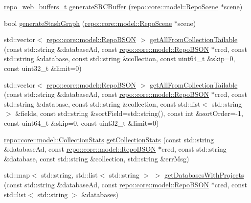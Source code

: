 \begin{DoxyCompactItemize}
\item 
\hyperlink{structrepo__web__buffers__t}{repo\+\_\+web\+\_\+buffers\+\_\+t} \hyperlink{classrepo_1_1manipulator_1_1_repo_manipulator_a3b14104b60d95c19be1b7b1ab507450a}{generate\+S\+R\+C\+Buffer} (\hyperlink{classrepo_1_1core_1_1model_1_1_repo_scene}{repo\+::core\+::model\+::\+Repo\+Scene} $\ast$scene)
\item 
bool \hyperlink{classrepo_1_1manipulator_1_1_repo_manipulator_ac301ad067f763595fc68a902a4249c35}{generate\+Stash\+Graph} (\hyperlink{classrepo_1_1core_1_1model_1_1_repo_scene}{repo\+::core\+::model\+::\+Repo\+Scene} $\ast$scene)
\item 
std\+::vector$<$ \hyperlink{classrepo_1_1core_1_1model_1_1_repo_b_s_o_n}{repo\+::core\+::model\+::\+Repo\+B\+S\+O\+N} $>$ \hyperlink{classrepo_1_1manipulator_1_1_repo_manipulator_a843070b9d4063b6f01e8287df7855e3c}{get\+All\+From\+Collection\+Tailable} (const std\+::string \&database\+Ad, const \hyperlink{classrepo_1_1core_1_1model_1_1_repo_b_s_o_n}{repo\+::core\+::model\+::\+Repo\+B\+S\+O\+N} $\ast$cred, const std\+::string \&database, const std\+::string \&collection, const uint64\+\_\+t \&skip=0, const uint32\+\_\+t \&limit=0)
\item 
std\+::vector$<$ \hyperlink{classrepo_1_1core_1_1model_1_1_repo_b_s_o_n}{repo\+::core\+::model\+::\+Repo\+B\+S\+O\+N} $>$ \hyperlink{classrepo_1_1manipulator_1_1_repo_manipulator_a097c73ccc24132242effc95d8359d960}{get\+All\+From\+Collection\+Tailable} (const std\+::string \&database\+Ad, const \hyperlink{classrepo_1_1core_1_1model_1_1_repo_b_s_o_n}{repo\+::core\+::model\+::\+Repo\+B\+S\+O\+N} $\ast$cred, const std\+::string \&database, const std\+::string \&collection, const std\+::list$<$ std\+::string $>$ \&fields, const std\+::string \&sort\+Field=std\+::string(), const int \&sort\+Order=-\/1, const uint64\+\_\+t \&skip=0, const uint32\+\_\+t \&limit=0)
\item 
\hyperlink{classrepo_1_1core_1_1model_1_1_collection_stats}{repo\+::core\+::model\+::\+Collection\+Stats} \hyperlink{classrepo_1_1manipulator_1_1_repo_manipulator_a0eb5c3ceb82cd51a1bac0542c320c42e}{get\+Collection\+Stats} (const std\+::string \&database\+Ad, const \hyperlink{classrepo_1_1core_1_1model_1_1_repo_b_s_o_n}{repo\+::core\+::model\+::\+Repo\+B\+S\+O\+N} $\ast$cred, const std\+::string \&database, const std\+::string \&collection, std\+::string \&err\+Msg)
\item 
std\+::map$<$ std\+::string, std\+::list$<$ std\+::string $>$ $>$ \hyperlink{classrepo_1_1manipulator_1_1_repo_manipulator_a00ca257f791f0ee957004d83d1b449c0}{get\+Databases\+With\+Projects} (const std\+::string \&database\+Ad, const \hyperlink{classrepo_1_1core_1_1model_1_1_repo_b_s_o_n}{repo\+::core\+::model\+::\+Repo\+B\+S\+O\+N} $\ast$cred, const std\+::list$<$ std\+::string $>$ \&databases)

\end{DoxyCompactItemize}
